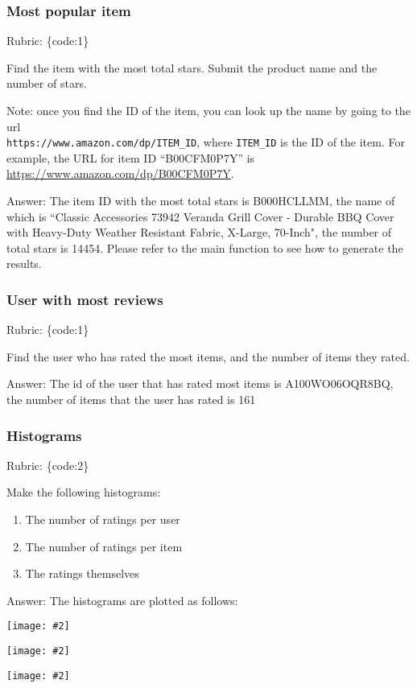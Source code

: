 \documentclass{article}
\def\rubric#1{\gre{Rubric: \{#1\}}}{}
\def\blu#1{{\color{blu}#1}}
\def\gre#1{{\color{gre}#1}}
\newcommand{\centerfig}[2]{\begin{center}\texttt{[image: \#2]}\end{center}}
\begin{document}
\subsubsection{Most popular item}
\rubric{code:1}

Find the item with the most total stars. \blu{Submit the product name and the number of stars}.

Note: once you find the ID of the item, you can look up the name by going to the url \\ \verb|https://www.amazon.com/dp/ITEM_ID|, where \verb|ITEM_ID| is the ID of the item.
For example, the URL for item ID ``B00CFM0P7Y'' is \url{https://www.amazon.com/dp/B00CFM0P7Y}.

\gre{Answer: The item ID with the most total stars is B000HCLLMM, the name of which is ``Classic Accessories 73942 Veranda Grill Cover - Durable BBQ Cover with Heavy-Duty Weather Resistant Fabric, X-Large, 70-Inch",  the number of total stars is 14454.  Please refer to the main function to see how to generate the results.}

\subsubsection{User with most reviews}
\rubric{code:1}

\blu{Find the user who has rated the most items, and the number of items they rated.}

\gre{Answer: The id of the user that has rated most items is A100WO06OQR8BQ, the number of items that the user has rated is 161
}


\subsubsection{Histograms}
\rubric{code:2}

\blu{Make the following histograms:}
\begin{enumerate}
\item The number of ratings per user
\item The number of ratings per item
\item The ratings themselves
\end{enumerate}

\gre{ Answer:
The histograms are plotted as follows:
}
\centerfig{.5}{../figs/q1_1_2_hist_numberofratings_per_user.pdf}
\centerfig{.5}{../figs/q1_1_2_hist_numberofratings_per_item.pdf}
\centerfig{.5}{../figs/q1_1_2_hist_ratings_themselves.pdf}
\end{document}
